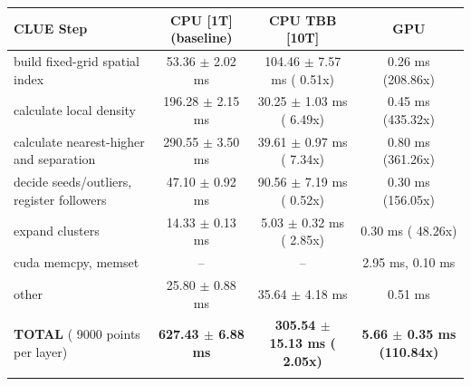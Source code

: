     \begin{tabular}{l|c|c|c}
    \hline
    CLUE Step                                 & CPU [1T] (baseline)         & CPU TBB [10T]                         & GPU                       \\ \hline
    build fixed-grid spatial index            &  53.36 $\pm$  2.02 ms       & 104.46 $\pm$  7.57 ms ( 0.51x)        &   0.26 ms (208.86x)       \\
    calculate local density                   & 196.28 $\pm$  2.15 ms       &  30.25 $\pm$  1.03 ms ( 6.49x)        &   0.45 ms (435.32x)       \\
    calculate nearest-higher and separation   & 290.55 $\pm$  3.50 ms       &  39.61 $\pm$  0.97 ms ( 7.34x)        &   0.80 ms (361.26x)       \\
    decide seeds/outliers, register followers &  47.10 $\pm$  0.92 ms       &  90.56 $\pm$  7.19 ms ( 0.52x)        &   0.30 ms (156.05x)       \\
    expand clusters                           &  14.33 $\pm$  0.13 ms       &   5.03 $\pm$  0.32 ms ( 2.85x)        &   0.30 ms ( 48.26x)       \\ \hline
    cuda memcpy, memset                       & --                          & --                                    &   2.95 ms,   0.10 ms      \\
    other                                     &  25.80 $\pm$  0.88 ms       &  35.64 $\pm$  4.18 ms                 &   0.51 ms                 \\ \hline
    \textbf{TOTAL} ( 9000 points per layer)   & \textbf{627.43 $\pm$  6.88 ms} & \textbf{305.54 $\pm$ 15.13 ms ( 2.05x)} & \textbf{  5.66 $\pm$  0.35 ms (110.84x)}  \\
    \hline
    \multicolumn{4}{c}{}
    \end{tabular}
    \linebreak


